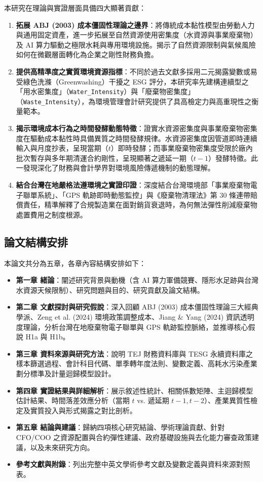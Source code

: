\documentclass[12pt,a4paper]{article}
\begin{document}
本研究在理論與實證層面具備四大顯著貢獻：
\begin{enumerate}[leftmargin=*]
    \item \textbf{拓展 ABJ (2003) 成本僵固性理論之邊界}：將傳統成本黏性模型由勞動人力與通用固定資產，進一步拓展至自然資源使用密集度（水資源與事業廢棄物）及 AI 算力驅動之極限水耗與專用環境設施。揭示了自然資源限制與氣候風險如何在微觀層面轉化為企業之剛性財務負擔。
    \item \textbf{提供高精準度之實質環境資源指標}：不同於過去文獻多採用二元揭露變數或易受綠色洗滌（Greenwashing）干擾之 ESG 評分，本研究率先建構連續型之「用水密集度」（\texttt{Water\_Intensity}）與「廢棄物密集度」（\texttt{Waste\_Intensity}），為環境管理會計研究提供了具高檢定力與高重現性之衡量範本。
    \item \textbf{揭示環境成本行為之時間發酵動態特徵}：證實水資源密集度與事業廢棄物密集度在驅動成本黏性時具備異質之時間發酵規律。水資源密集度因管道即時連續輸入與月度抄表，呈現當期（$t$）即時發酵；而事業廢棄物密集度受限於廠內批次暫存與多年期清運合約剛性，呈現顯著之遞延一期（$t-1$）發酵特徵。此一發現深化了財務與會計學界對環境風險傳遞機制的動態理解。
    \item \textbf{結合台灣在地嚴格法遵環境之實證印證}：深度結合台灣環境部「事業廢棄物電子聯單系統」、「GPS 軌跡即時動態監控」與《廢棄物清理法》第 30 條連帶賠償責任，精準解釋了合規製造業在面對銷貨衰退時，為何無法彈性削減廢棄物處置費用之制度根源。
\end{enumerate}

\subsection{論文結構安排}

本論文共分為五章，各章內容結構安排如下：
\begin{itemize}
    \item \textbf{第一章 緒論}：闡述研究背景與動機（含 AI 算力軍備競賽、隱形水足跡與台灣水資源天候限制）、研究問題與目的、研究貢獻及論文結構。
    \item \textbf{第二章 文獻探討與研究假說}：深入回顧 ABJ (2003) 成本僵固性理論三大經典學派、Zeng et al. (2024) 環境政策調整成本、Jiang \& Yang (2024) 資訊透明度理論，分析台灣在地廢棄物電子聯單與 GPS 軌跡監控脈絡，並推導核心假說 H1a 與 H1b。
    \item \textbf{第三章 資料來源與研究方法}：說明 TEJ 財務資料庫與 TESG 永續資料庫之樣本篩選過程、會計科目代碼、單季轉年度法則、變數定義、高耗水污染產業劃分標準及計量迴歸模型設計。
    \item \textbf{第四章 實證結果與詳細解析}：展示敘述性統計、相關係數矩陣、主迴歸模型估計結果、時間落差效應分析（當期 $t$ vs. 遞延期 $t-1, t-2$）、產業異質性檢定及實質投入與形式揭露之對比剖析。
    \item \textbf{第五章 結論與建議}：歸納四項核心研究結論、學術理論貢獻、針對 CFO/COO 之資源配置與合約彈性建議、政府基礎設施與去化能力審查政策建議，以及未來研究方向。
    \item \textbf{參考文獻與附錄}：列出完整中英文學術參考文獻及變數定義與資料來源對照表。
\end{itemize}
\end{document}
